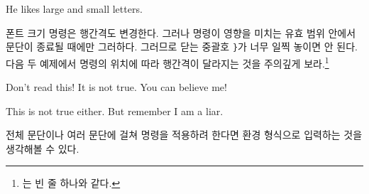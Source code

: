 \begin{example}
He likes {\LARGE large and
{\small small} letters}.
\end{example}

폰트 크기 명령은 행간격도 변경한다. 그러나 명령이 영향을 미치는 유효 범위 안에서 문단이 종료될 때에만 그러하다. 그러므로 닫는 중괄호 \verb|}|가 너무 일찍 놓이면 안 된다. 다음 두 예제에서  명령의 위치에 따라 행간격이 달라지는 것을 주의깊게 보라.\footnote{는 빈 줄 하나와 같다.}



\begin{example}
{\Large Don't read this!
 It is not true.
 You can believe me!\par}
\end{example}

\vspace{-.5\onelineskip}

\begin{example}
{\Large This is not true either.
But remember I am a liar.}\par
\end{example}


전체 문단이나 여러 문단에 걸쳐  명령을 적용하려 한다면 환경 형식으로 입력하는 것을 생각해볼 수 있다.


